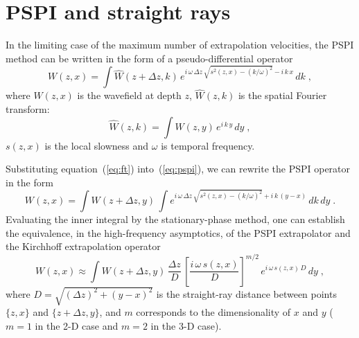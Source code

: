 \section{PSPI and straight rays}

In the limiting case of the maximum number of extrapolation velocities, the
PSPI method \cite[]{GEO49-02-01240131} can be written in the form of a
pseudo-differential operator \cite[]{GEO64-04-10671078}
\begin{equation}
  \label{eq:pspi}
  W(z,x) = \int \widehat{W}(z+\Delta z,k)\,
  e^{i\,\omega\,\Delta z\,\sqrt{s^2(z,x)-(k/\omega)^2}-i\,k\,x}\,d k\;,
\end{equation}
where $W(z,x)$ is the wavefield at depth $z$, $\widehat{W}(z,k)$
is the spatial Fourier transform:
\begin{equation}
  \label{eq:ft}
  \widehat{W}(z,k) = \int W(z,y)\,e^{i\,k\,y}\,d y\;,
\end{equation}
$s(z,x)$ is the local slowness and $\omega$ is temporal frequency.

Substituting equation~(\ref{eq:ft}) into~(\ref{eq:pspi}), we can rewrite the
PSPI operator in the form
\begin{equation}
  \label{eq:pspi2}
  W(z,x) = \int W(z+\Delta z,y)\,\int
  e^{i\,\omega\,\Delta z\,\sqrt{s^2(z,x)-(k/\omega)^2}+i\,k\,(y-x)}\,
  d k\,d y\;.
\end{equation}
Evaluating the inner integral by the stationary-phase method, one can
establish the equivalence, in the high-frequency asymptotics, of the PSPI
extrapolator and the Kirchhoff extrapolation operator
\begin{equation}
  \label{eq:kirch}
  W(z,x) \approx \int 
  W(z+\Delta z,y)\,
  \frac{\Delta z}{D}\,
  \left[\frac{i\,\omega\,s(z,x)}{D}\right]^{m/2}\,
  e^{i\,\omega\,s(z,x)\,D}\,d y\;,
\end{equation}
where $D = \sqrt{(\Delta z)^2+(y-x)^2}$ is the straight-ray
distance between points $\{z,x\}$ and $\{z+\Delta z,y\}$, and $m$ corresponds
to the dimensionality of $x$ and $y$ ($m=1$ in the 2-D case and $m=2$ in the
3-D case).
  


